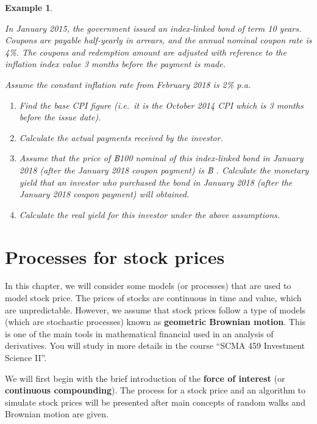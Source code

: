 \documentclass[landscape, 20pt]{extreport}
\theoremstyle{definition}
\theoremstyle{definition}
\newtheorem{example}{Example}[chapter]
\theoremstyle{definition}
\theoremstyle{definition}
\theoremstyle{remark}
\begin{document}
\newpage \begin{example}
\protect\hypertarget{exm:exampleILB2}{}\label{exm:exampleILB2}

\emph{In January 2015, the government issued an
index-linked bond of term 10 years. Coupons are payable half-yearly in
arrears, and the annual nominal coupon rate is 4\%. The coupons and
redemption amount are adjusted with reference to the inflation index
value 3 months before the payment is made.}

\emph{Assume the constant inflation rate from February 2018 is 2\% p.a.}

\begin{enumerate}
\def\labelenumi{\arabic{enumi}.}
\item
  \emph{Find the base CPI figure (i.e.~it is the October 2014 CPI which is
  3 months before the issue date).}
\item
  \emph{Calculate the actual payments received by the investor.}
\item
  \emph{Assume that the price of ฿100 nominal of this index-linked bond in
  January 2018 (after the January 2018 coupon payment) is ฿ .
  Calculate the monetary yield that an investor who purchased the bond
  in January 2018 (after the January 2018 coupon payment) will
  obtained.}
\item
  \emph{Calculate the real yield for this investor under the above
  assumptions.}
\end{enumerate}

\end{example}

\hypertarget{processes-for-stock-prices}{%
\chapter{Processes for stock prices}\label{processes-for-stock-prices}}

In this chapter, we will consider some models (or processes) that are
used to model stock price. The prices of stocks are continuous in time
and value, which are unpredictable. However, we assume that stock prices
follow a type of models (which are stochastic processes) known as
\textbf{geometric Brownian motion}. This is one of the main tools in
mathematical financial used in an analysis of derivatives. You will
study in more details in the course ``SCMA 459 Investment Science II''.

We will first begin with the brief introduction of the \textbf{force of
interest} (or \textbf{continuous compounding}). The process for a stock
price and an algorithm to simulate stock prices will be presented after
main concepts of random walks and Brownian motion are given.
\end{document}
